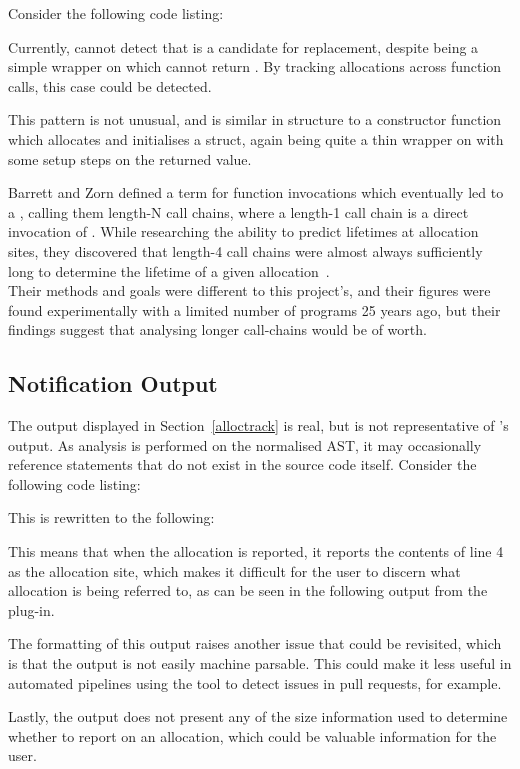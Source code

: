 Consider the following code listing:



Currently,  cannot detect that  is a candidate for replacement, despite  being a simple wrapper on \malloc{} which cannot return . By tracking allocations across function calls, this case could be detected.

This pattern is not unusual, and is similar in structure to a constructor function which allocates and initialises a struct, again being quite a thin wrapper on \malloc{} with some setup steps on the returned value.

Barrett and Zorn defined a term for function invocations which eventually led to a \malloc{}, calling them length-N call chains, where a length-1 call chain is a direct invocation of \malloc{}. While researching the ability to predict lifetimes at allocation sites, they discovered that length-4 call chains were almost always sufficiently long to determine the lifetime of a given allocation~\cite{predictors}. \\
Their methods and goals were different to this project's, and their figures were found experimentally with a limited number of programs 25 years ago, but their findings suggest that analysing longer call-chains would be of worth.

\subsection{Notification Output}

The output displayed in Section~\ref{alloctrack} is real, but is not representative of 's output. As analysis is performed on the normalised AST, it may occasionally reference statements that do not exist in the source code itself. Consider the following code listing:



This is rewritten to the following:



This means that when the allocation is reported, it reports the contents of line 4 as the allocation site, which makes it difficult for the user to discern what allocation is being referred to, as can be seen in the following output from the plug-in.



The formatting of this output raises another issue that could be revisited, which is that the output is not easily machine parsable. This could make it less useful in automated pipelines using the tool to detect issues in pull requests, for example.

Lastly, the output does not present any of the size information used to determine whether to report on an allocation, which could be valuable information for the user.
